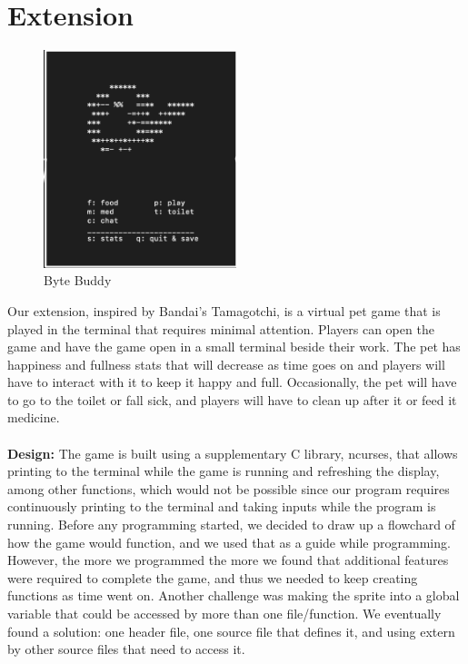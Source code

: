 \documentclass[11pt]{article}
\begin{document}
\section{Extension}
\begin{figure}[t]
    \centering
    \includegraphics[width=0.5\textwidth]{tamagotchi.png}
    \caption{Byte Buddy}
    \label{fig:tamagotchi}
\end{figure}
Our extension, inspired by Bandai’s Tamagotchi, is a virtual pet game that is played in the terminal that requires minimal attention. Players can open the game and have the game open in a small terminal beside their work. The pet has happiness and fullness stats that will decrease as time goes on and players will have to interact with it to keep it happy and full. Occasionally, the pet will have to go to the toilet or fall sick, and players will have to clean up after it or feed it medicine.\\\\
\textbf{Design:}
The game is built using a supplementary C library, ncurses, that allows printing to the terminal while the game is running and refreshing the display, among other functions, which would not be possible since our program requires continuously printing to the terminal and taking inputs while the program is running.
Before any programming started, we decided to draw up a flowchard of how the game would function, and we used that as a guide while programming. However, the more we programmed the more we found that additional features were required to complete the game, and thus we needed to keep creating functions as time went on.
Another challenge was making the sprite into a global variable that could be accessed by more than one file/function. We eventually found a solution: one header file, one source file that defines it, and using extern by other source files that need to access it.
\end{document}
